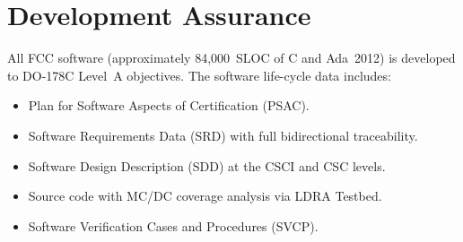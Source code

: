 \section{Development Assurance}
All FCC software (approximately 84,000~SLOC of C and Ada~2012) is developed
to DO-178C Level~A objectives. The software life-cycle data includes:

\begin{itemize}
  \item Plan for Software Aspects of Certification (PSAC).
  \item Software Requirements Data (SRD) with full bidirectional traceability.
  \item Software Design Description (SDD) at the CSCI and CSC levels.
  \item Source code with MC/DC coverage analysis via LDRA Testbed.
  \item Software Verification Cases and Procedures (SVCP).
\end{itemize}

\newpage

